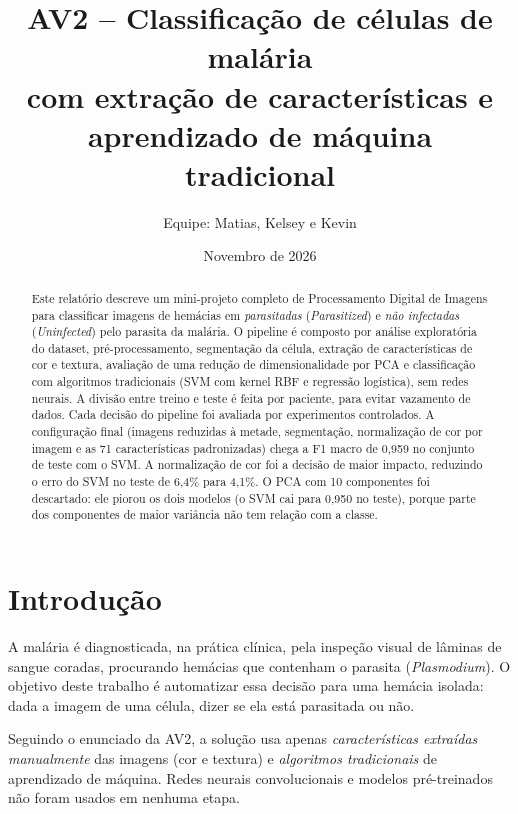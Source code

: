 \documentclass[11pt,a4paper]{article}
\title{AV2 -- Classificação de células de malária\\com extração de características e aprendizado de máquina tradicional}
\author{Equipe: Matias, Kelsey e Kevin}
\date{Novembro de 2026}
\begin{document}
\maketitle

\begin{abstract}
Este relatório descreve um mini-projeto completo de Processamento Digital de Imagens para classificar
imagens de hemácias em \emph{parasitadas} (\textit{Parasitized}) e \emph{não infectadas}
(\textit{Uninfected}) pelo parasita da malária. O pipeline é composto por análise exploratória do
dataset, pré-processamento, segmentação da célula, extração de características de cor e textura,
avaliação de uma redução de dimensionalidade por PCA e classificação com algoritmos tradicionais (SVM
com kernel RBF e regressão logística), sem redes neurais. A divisão entre treino e teste é feita por
paciente, para evitar vazamento de dados. Cada decisão do pipeline foi avaliada por experimentos
controlados. A configuração final (imagens reduzidas à metade, segmentação, normalização de cor por
imagem e as 71 características padronizadas) chega a F1 macro de 0,959 no conjunto de teste com o
SVM. A normalização de cor foi a decisão de maior impacto, reduzindo o erro do SVM no teste de 6,4\% para
4,1\%. O PCA com 10 componentes foi descartado: ele piorou os dois modelos (o SVM cai para 0,950 no
teste), porque parte dos componentes de maior variância não tem relação com a classe.
\end{abstract}

\tableofcontents
\newpage

\section{Introdução}

A malária é diagnosticada, na prática clínica, pela inspeção visual de lâminas de sangue coradas,
procurando hemácias que contenham o parasita (\textit{Plasmodium}). O objetivo deste trabalho é
automatizar essa decisão para uma hemácia isolada: dada a imagem de uma célula, dizer se ela está
parasitada ou não.

Seguindo o enunciado da AV2, a solução usa apenas \emph{características extraídas manualmente} das
imagens (cor e textura) e \emph{algoritmos tradicionais} de aprendizado de máquina. Redes neurais
convolucionais e modelos pré-treinados não foram usados em nenhuma etapa.
\end{document}
